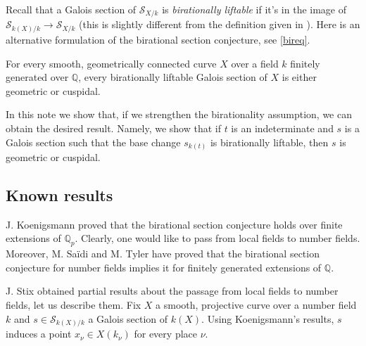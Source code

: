 \documentclass[11pt]{amsart}
\theoremstyle{plain}
\theoremstyle{definition}
\newcommand{\1}{\mathbb{1}}
\newcommand{\mc}{\mathcal}
\newcommand{\Q}{\mathbb{Q}}
\renewcommand{\projlim}{\varprojlim}
\begin{document}
Recall that a Galois section of $\mc{S}_{X/k}$ is \emph{birationally liftable} if it's in the image of $\mc{S}_{k(X)/k}\to\mc{S}_{X/k}$ \cite[\S 2.1.1]{sti15} (this is slightly different from the definition given in \cite[Definition 266]{sti13}). Here is an alternative formulation of the birational section conjecture, see \autoref{bireq}.


\begin{BSC2}
    For every smooth, geometrically connected curve $X$ over a field $k$ finitely generated over $\Q$, every birationally liftable Galois section of $X$ is either geometric or cuspidal.
\end{BSC2}



In this note we show that, if we strengthen the birationality assumption, we can obtain the desired result. Namely, we show that if $t$ is an indeterminate and $s$ is a Galois section such that the base change $s_{k(t)}$ is birationally liftable, then $s$ is geometric or cuspidal. 

\subsection{Known results}

J. Koenigsmann \cite{koe05} proved that the birational section conjecture holds over finite extensions of $\Q_{p}$. Clearly, one would like to pass from local fields to number fields. Moreover, M. Sa\"idi and M. Tyler \cite{saty21} have proved that the birational section conjecture for number fields implies it for finitely generated extensions of $\Q$.

J. Stix \cite{sti15} obtained partial results about the passage from local fields to number fields, let us describe them. Fix $X$ a smooth, projective curve over a number field $k$ and $s\in\mc{S}_{k(X)/k}$ a Galois section of $k(X)$. Using Koenigsmann's results, $s$ induces a point $x_{\nu}\in X(k_{\nu})$ for every place $\nu$.
\end{document}
